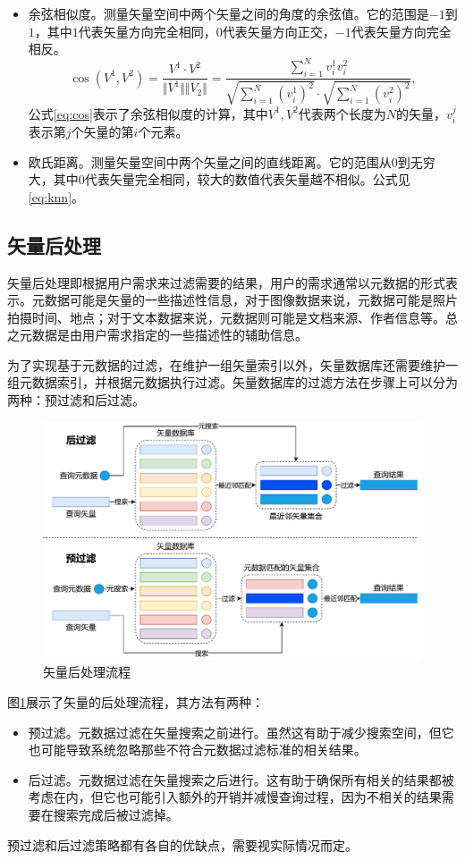 \begin{itemize}
    \item 余弦相似度。测量矢量空间中两个矢量之间的角度的余弦值。它的范围是$-1$到$1$，其中$1$代表矢量方向完全相同，$0$代表矢量方向正交，$-1$代表矢量方向完全相反。
    \begin{equation}
        \cos(V^1,V^2)=\frac{V^1\cdot V^2}{\Vert V^1\Vert\Vert V_2\Vert}=\frac{\sum_{i=1}^Nv_i^1v_i^2}{\sqrt{\sum_{i=1}^N(v_i^1)^2}\cdot\sqrt{\sum_{i=1}^N(v_i^2)^2}},
        \label{eq:cos}
    \end{equation}
    公式\ref{eq:cos}表示了余弦相似度的计算，其中$V^1,V^2$代表两个长度为$N$的矢量，$v_i^j$表示第$j$个矢量的第$i$个元素。
    \item 欧氏距离。测量矢量空间中两个矢量之间的直线距离。它的范围从$0$到无穷大，其中$0$代表矢量完全相同，较大的数值代表矢量越不相似。公式见\ref{eq:knn}。
\end{itemize}

\subsection{矢量后处理}

矢量后处理即根据用户需求来过滤需要的结果，用户的需求通常以元数据的形式表示。元数据可能是矢量的一些描述性信息，对于图像数据来说，元数据可能是照片拍摄时间、地点；对于文本数据来说，元数据则可能是文档来源、作者信息等。总之元数据是由用户需求指定的一些描述性的辅助信息。

为了实现基于元数据的过滤，在维护一组矢量索引以外，矢量数据库还需要维护一组元数据索引，并根据元数据执行过滤。矢量数据库的过滤方法在步骤上可以分为两种：预过滤和后过滤。

\begin{figure}[H]
    \includegraphics[width=\textwidth]{examples/filter.pdf}
    \centering
    \caption{矢量后处理流程}
    \label{fig:filter}
\end{figure}

图\ref{fig:filter}展示了矢量的后处理流程，其方法有两种：

\begin{itemize}
    \item 预过滤。元数据过滤在矢量搜索之前进行。虽然这有助于减少搜索空间，但它也可能导致系统忽略那些不符合元数据过滤标准的相关结果。
    \item 后过滤。元数据过滤在矢量搜索之后进行。这有助于确保所有相关的结果都被考虑在内，但它也可能引入额外的开销并减慢查询过程，因为不相关的结果需要在搜索完成后被过滤掉。
\end{itemize}

预过滤和后过滤策略都有各自的优缺点，需要视实际情况而定。